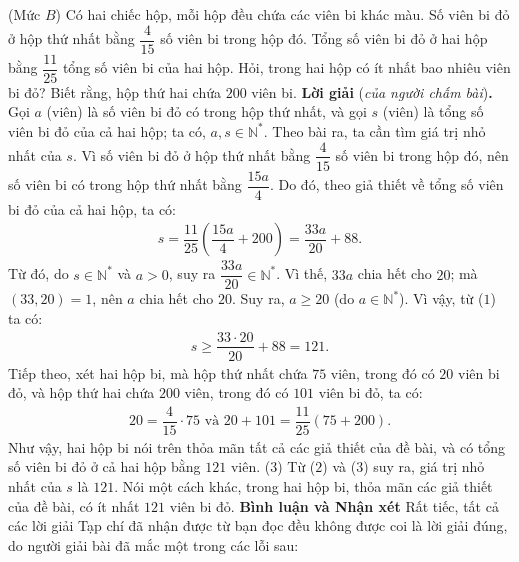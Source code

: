\begin{multicols}{2}
	\setlength{\abovedisplayskip}{4pt}
	\setlength{\belowdisplayskip}{4pt}
	{}
	(Mức $B$)
	Có hai chiếc hộp, mỗi hộp đều chứa các viên bi khác màu. Số viên bi đỏ ở hộp thứ nhất bằng $\dfrac{4}{15}$ số viên bi trong hộp đó. Tổng số viên bi đỏ ở hai hộp bằng $\dfrac{11}{25}$ tổng số viên bi của hai hộp. Hỏi, trong hai hộp có ít nhất bao nhiêu viên bi đỏ? Biết rằng, hộp thứ hai chứa $200$ viên bi.
	\vskip 0.05cm
	\textbf{\color{thachthuctoanhoc}Lời giải} (\textit{của người chấm bài})\textbf{\color{thachthuctoanhoc}.}
	\vskip 0.05cm
	Gọi $a$ (viên) là số viên bi đỏ có trong hộp thứ nhất, và gọi $s$ (viên) là tổng số viên bi đỏ của cả hai hộp; ta có, $a, s \in \mathbb{N^*}$. Theo bài ra, ta cần tìm giá trị nhỏ nhất của $s$.
	\vskip 0.05cm
	Vì số viên bi đỏ ở hộp thứ nhất bằng $\dfrac{4}{15}$  số viên bi trong hộp đó, nên số viên bi có trong hộp thứ nhất bằng  $\dfrac{15a}{4}$. Do đó, theo giả thiết về tổng số viên bi đỏ của cả hai hộp, ta có:
	\begin{align*}
		s = \dfrac{{11}}{{25}}\left( {\dfrac{{15a}}{4} + 200} \right) = \dfrac{{33a}}{{20}} + 88. \tag{$1$}
	\end{align*}
	Từ đó, do $s \in \mathbb{N^*}$ và $a > 0$, suy ra  $\dfrac{33a}{20} \in \mathbb{N^*}$. Vì thế, $33a$ chia hết cho $20$; mà $(33, 20) = 1$, nên $a$ chia hết cho $20$. Suy ra, $a \ge 20$ (do  $a \in \mathbb{N^*}$). Vì vậy, từ ($1$) ta có:
	\begin{align*}
		s \ge \dfrac{{33 \cdot 20}}{{20}} + 88 = 121. \tag{$2$}	
	\end{align*}
	Tiếp theo, xét hai hộp bi, mà hộp thứ nhất chứa $75$ viên, trong đó có $20$ viên bi đỏ, và hộp thứ hai chứa $200$ viên, trong đó có $101$ viên bi đỏ, ta có:
	\begin{align*}
		20 = \dfrac{4}{{15}} \cdot 75 \text{ và } 20 + 101 = \dfrac{{11}}{{25}}\left( {75 + 200} \right).
	\end{align*}
	Như vậy, hai hộp bi nói trên thỏa mãn tất cả các giả thiết của đề bài, và có tổng số viên bi đỏ ở cả hai hộp bằng $121$ viên. \hfill ($3$)
	\vskip 0.05cm
	Từ ($2$) và ($3$) suy ra, giá trị nhỏ nhất của $s$ là $121$. Nói một cách khác, trong hai hộp bi, thỏa mãn các giả thiết của đề bài, có ít nhất $121$ viên bi đỏ.
	\vskip 0.05cm
	\columnbreak
	\textbf{\color{thachthuctoanhoc}Bình luận và Nhận xét}
	\vskip 0.05cm	
	Rất tiếc, tất cả các lời giải Tạp chí đã nhận được từ bạn đọc đều không được coi là lời giải đúng, do người giải bài đã mắc một trong các lỗi sau:

\end{multicols}

